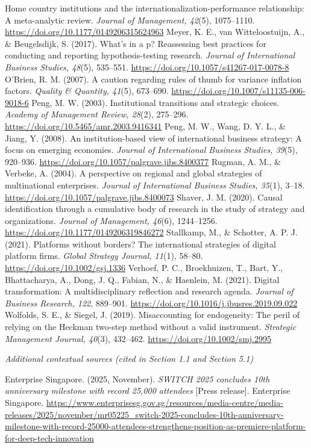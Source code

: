 \documentclass[
  12pt,a4paper]{article}
\begin{document}
Home country institutions and the internationalization-performance
relationship: A meta-analytic review. \emph{Journal of Management,
42}(5), 1075--1110. \url{https://doi.org/10.1177/0149206315624963}
Meyer, K. E., van Witteloostuijn, A., \& Beugelsdijk, S. (2017). What's
in a p? Reassessing best practices for conducting and reporting
hypothesis-testing research. \emph{Journal of International Business
Studies, 48}(5), 535--551.
\url{https://doi.org/10.1057/s41267-017-0078-8} O'Brien, R. M. (2007). A
caution regarding rules of thumb for variance inflation factors.
\emph{Quality \& Quantity, 41}(5), 673--690.
\url{https://doi.org/10.1007/s11135-006-9018-6} Peng, M. W. (2003).
Institutional transitions and strategic choices. \emph{Academy of
Management Review, 28}(2), 275--296.
\url{https://doi.org/10.5465/amr.2003.9416341} Peng, M. W., Wang, D. Y.
L., \& Jiang, Y. (2008). An institution-based view of international
business strategy: A focus on emerging economies. \emph{Journal of
International Business Studies, 39}(5), 920--936.
\url{https://doi.org/10.1057/palgrave.jibs.8400377} Rugman, A. M., \&
Verbeke, A. (2004). A perspective on regional and global strategies of
multinational enterprises. \emph{Journal of International Business
Studies, 35}(1), 3--18.
\url{https://doi.org/10.1057/palgrave.jibs.8400073} Shaver, J. M.
(2020). Causal identification through a cumulative body of research in
the study of strategy and organizations. \emph{Journal of Management,
46}(6), 1244--1256. \url{https://doi.org/10.1177/0149206319846272}
Stallkamp, M., \& Schotter, A. P. J. (2021). Platforms without borders?
The international strategies of digital platform firms. \emph{Global
Strategy Journal, 11}(1), 58--80. \url{https://doi.org/10.1002/gsj.1336}
Verhoef, P. C., Broekhuizen, T., Bart, Y., Bhattacharya, A., Dong, J.
Q., Fabian, N., \& Haenlein, M. (2021). Digital transformation: A
multidisciplinary reflection and research agenda. \emph{Journal of
Business Research, 122}, 889--901.
\url{https://doi.org/10.1016/j.jbusres.2019.09.022} Wolfolds, S. E., \&
Siegel, J. (2019). Misaccounting for endogeneity: The peril of relying
on the Heckman two-step method without a valid instrument.
\emph{Strategic Management Journal, 40}(3), 432--462.
\url{https://doi.org/10.1002/smj.2995}

\emph{Additional contextual sources (cited in Section 1.1 and Section
5.1)}

Enterprise Singapore. (2025, November). \emph{SWITCH 2025 concludes 10th
anniversary milestone with record 25,000 attendees} {[}Press release{]}.
Enterprise Singapore.
\url{https://www.enterprisesg.gov.sg/resources/media-centre/media-releases/2025/november/mr05225_switch-2025-concludes-10th-anniversary-milestone-with-record-25000-attendees-strengthens-position-as-premiere-platform-for-deep-tech-innovation}
\end{document}

